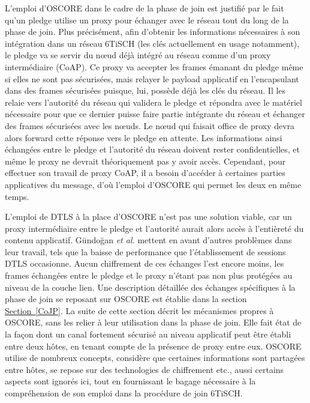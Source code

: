 \documentclass[]{report}
\newcommand{\wordlink}[2]{\hyperref[#2]{#1~\ref{#2}}}
\begin{document}
\par L'emploi d'OSCORE dans le cadre de la phase de join est justifié par le fait qu'un pledge utilise un proxy pour échanger avec le réseau tout du long de la phase de join. Plus précisément, afin d'obtenir les informations nécessaires à son intégration dans un réseau 6TiSCH (les clés actuellement en usage notamment), le pledge va se servir du nœud déjà intégré au réseau comme d'un proxy intermédiaire (CoAP). Ce proxy va accepter les frames émanant du pledge même si elles ne sont pas sécurisées, mais relayer le payload applicatif en l'encapsulant dans des frames sécurisées puisque, lui, possède déjà les clés du réseau. Il les relaie vers l'autorité du réseau qui validera le pledge et répondra avec le matériel nécessaire pour que ce dernier puisse faire partie intégrante du réseau et échanger des frames sécurisées avec les nœuds. Le nœud qui faisait office de proxy devra alors forward cette réponse vers le pledge en attente. Les informations ainsi échangées entre le pledge et l'autorité du réseau doivent rester confidentielles, et même le proxy ne devrait théoriquement pas y avoir accès. Cependant, pour effectuer son travail de proxy CoAP, il a besoin d'accéder à certaines parties applicatives du message, d'où l'emploi d'OSCORE qui permet les deux en même temps.\\

\par L'emploi de DTLS à la place d'OSCORE n'est pas une solution viable, car un proxy intermédiaire entre le pledge et l'autorité aurait alors accès à l'entièreté du contenu applicatif. Gündoğan \textit{et al.} \cite{OSCOREvsNDN} mettent en avant d'autres problèmes dans leur travail, tels que la baisse de performance que l'établissement de sessions DTLS occasionne. Aucun chiffrement de ces échanges l'est encore moins, les frames échangées entre le pledge et le proxy n'étant pas non plus protégées au niveau de la couche lien. Une description détaillée des échanges spécifiques à la phase de join se reposant sur OSCORE est établie dans la section \wordlink{Section}{CoJP}. La suite de cette section décrit les mécanismes propres à OSCORE, sans les relier à leur utilisation dans la phase de join. Elle fait état de la façon dont un canal fortement sécurisé au niveau applicatif peut être établi entre deux hôtes, en tenant compte de la présence de proxy entre eux. OSCORE utilise de nombreux concepts, considère que certaines informations sont partagées entre hôtes, se repose sur des technologies de chiffrement etc., aussi certains aspects sont ignorés ici, tout en fournissant le bagage nécessaire à la compréhension de son emploi dans la procédure de join 6TiSCH.\\
\end{document}
